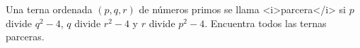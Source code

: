 Una terna ordenada $(p, q, r)$ de números primos se llama <i>parcera</i> si $p$ divide $q^2-4$, $q$ divide $r^2-4$ y $r$ divide $p^2-4$. Encuentra todos las ternas parceras.
